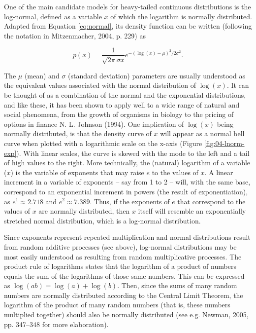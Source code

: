 \documentclass[
  12pt,
]{book}
\begin{document}
One of the main candidate models for heavy-tailed continuous distributions is the log-normal, defined as a variable \(x\) of which the logarithm is normally distributed. Adapted from Equation \eqref{eq:normal}, its density function can be written (following the notation in Mitzenmacher, 2004, p. 229) as

\begin{equation}
p(x)=\frac{1}{\sqrt{2\pi}\sigma x}e^{-(\log(x)-\mu)^2/2\sigma^2}.
\label{eq:log-normal}
\end{equation}

The \(\mu\) (mean) and \(\sigma\) (standard deviation) parameters are usually understood as the equivalent values associated with the normal distribution of \(\log(x)\). It can be thought of as a combination of the normal and the exponential distributions, and like these, it has been shown to apply well to a wide range of natural and social phenomena, from the growth of organisms in biology to the pricing of options in finance N. L. Johnson (1994). One implication of \(\log (x)\) being normally distributed, is that the density curve of \(x\) will appear as a normal bell curve when plotted with a logarithmic scale on the x-axis (Figure \ref{fig:04-lnorm-exp}). With linear scales, the curve is skewed with the mode to the left and a tail of high values to the right. More technically, the (natural) logarithm of a variable (\(x\)) is the variable of exponents that may raise \(e\) to the values of \(x\). A linear increment in a variable of exponents -- say from 1 to 2 -- will, with the same base, correspond to an exponential increment in powers (the result of exponentiation), as \(e^1 \approx 2.718\) and \(e^2 \approx 7.389\). Thus, if the exponents of \(e\) that correspond to the values of \(x\) are normally distributed, then \(x\) itself will resemble an exponentially stretched normal distribution, which is a log-normal distribution.

Since exponents represent repeated multiplication and normal distributions result from random additive processes (see above), log-normal distributions may be most easily understood as resulting from random multiplicative processes. The product rule of logarithms states that the logarithm of a product of numbers equals the sum of the logarithms of those same numbers. This can be expressed as \(\log (ab) = \log (a) + \log (b)\). Then, since the sums of many random numbers are normally distributed according to the Central Limit Theorem, the logarithm of the product of many random numbers (that is, these numbers multiplied together) should also be normally distributed (see e.g. Newman, 2005, pp. 347--348 for more elaboration).
\end{document}
